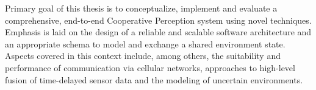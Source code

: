 Primary goal of this thesis is to conceptualize, implement and evaluate a comprehensive, end-to-end Cooperative Perception system using novel techniques. Emphasis is laid on the design of a reliable and scalable software architecture and an appropriate schema to model and exchange a shared environment state. Aspects covered in this context include, among others, the suitability and performance of communication via cellular networks, approaches to high-level fusion of time-delayed sensor data and the modeling of uncertain environments. 